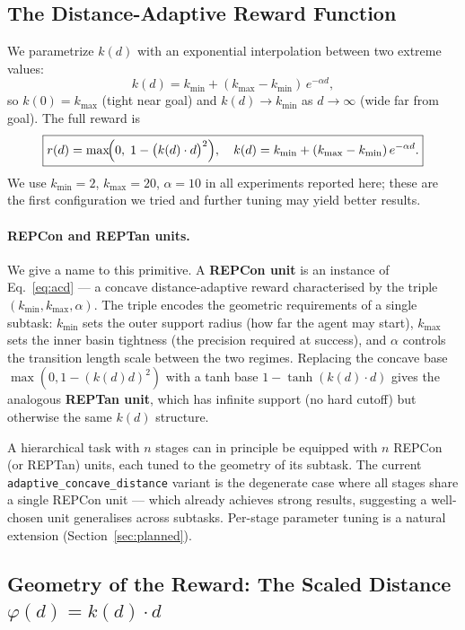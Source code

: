 \documentclass{article}
\begin{document}
\subsection{The Distance-Adaptive Reward Function}

We parametrize $k(d)$ with an exponential interpolation between two extreme values:
\begin{equation}
    k(d) = k_{\min} + (k_{\max} - k_{\min})\,e^{-\alpha d},
    \label{eq:kd}
\end{equation}
so $k(0) = k_{\max}$ (tight near goal) and $k(d) \to k_{\min}$ as $d \to \infty$ (wide
far from goal). The full reward is
\begin{equation}
    \boxed{r(d) = \max\!\Bigl(0,\; 1 - \bigl(k(d)\cdot d\bigr)^2\Bigr),
    \quad k(d) = k_{\min} + (k_{\max} - k_{\min})\,e^{-\alpha d}.}
    \label{eq:acd}
\end{equation}
We use $k_{\min}=2$, $k_{\max}=20$, $\alpha=10$ in all experiments reported here;
these are the first configuration we tried and further tuning may yield better results.

\paragraph{REPCon and REPTan units.}
We give a name to this primitive. A \textbf{REPCon unit} is an instance of
Eq.~\eqref{eq:acd} --- a concave distance-adaptive reward characterised by the
triple $(k_{\min}, k_{\max}, \alpha)$. The triple encodes the geometric requirements
of a single subtask: $k_{\min}$ sets the outer support radius (how far the agent may
start), $k_{\max}$ sets the inner basin tightness (the precision required at success),
and $\alpha$ controls the transition length scale between the two regimes.
Replacing the concave base $\max(0,1-(k(d)d)^2)$ with a tanh base
$1-\tanh(k(d)\cdot d)$ gives the analogous \textbf{REPTan unit}, which has
infinite support (no hard cutoff) but otherwise the same $k(d)$ structure.

A hierarchical task with $n$ stages can in principle be equipped with $n$ REPCon (or
REPTan) units, each tuned to the geometry of its subtask. The current
\texttt{adaptive\_concave\_distance} variant is the degenerate case where all stages
share a single REPCon unit --- which already achieves strong results, suggesting a
well-chosen unit generalises across subtasks. Per-stage parameter tuning is a natural
extension (Section~\ref{sec:planned}).

\subsection{Geometry of the Reward: The Scaled Distance $\varphi(d) = k(d)\cdot d$}
\end{document}
